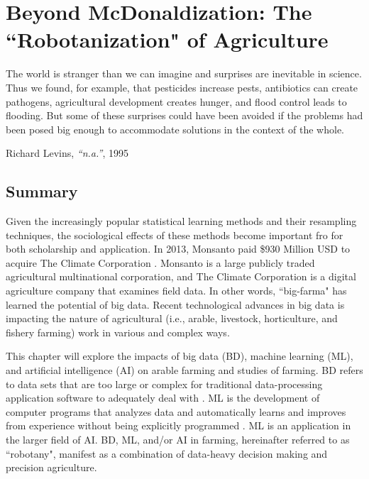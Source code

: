 \chapter[Beyond McDonaldization]{Beyond McDonaldization: The ``Robotanization" of Agriculture} \label{ch6:sociology}
\setlength{\epigraphwidth}{4.5in}
\epigraph{The world is stranger than we can imagine and surprises are inevitable in science. Thus we found, for example, that pesticides increase pests, antibiotics can create pathogens, agricultural development creates hunger, and flood control leads to flooding. But some of these surprises could have been avoided if the problems had been posed big enough to accommodate solutions in the context of the whole.}{Richard Levins, \textit{``n.a.''}, 1995}

\section*{Summary} 
Given the increasingly popular statistical learning methods and their resampling techniques, the sociological effects of these methods become important fro for both scholarship and application. In 2013, Monsanto paid \$930 Million USD to acquire The Climate Corporation \cite{frobes2013merger}. Monsanto is a large publicly traded agricultural multinational corporation, and The Climate Corporation is a digital agriculture company that examines field data. In other words, ``big-farma" has learned the potential of big data. Recent technological advances in big data is impacting the nature of agricultural (i.e., arable, livestock, horticulture, and fishery farming) work in various and complex ways. 

This chapter will explore the impacts of big data (BD), machine learning (ML), and artificial intelligence (AI) on arable farming and studies of farming. BD refers to data sets that are too large or complex for traditional data-processing application software to adequately deal with \cite{wiki2018bigdata}. ML is the development of computer programs that analyzes data and automatically learns and improves from experience without being explicitly programmed \cite{koza1996automated}.  ML is an application in the larger field of AI. BD, ML, and/or AI in farming, hereinafter referred to as ``robotany", manifest as a combination of data-heavy decision making and precision agriculture. 

